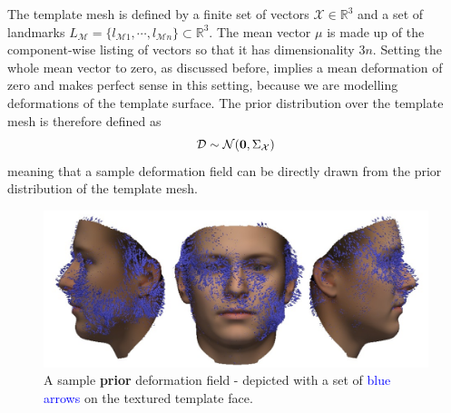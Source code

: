 The template mesh is defined by a finite set of vectors $\mathcal{X} \in \mathbb{R}^3$ and a set of landmarks $L_\mathcal{M}=\{l_{\mathcal{M}1}, \cdots, l_{\mathcal{M}n}\} \subset \mathbb{R}^3$.
The mean vector $\mu$ is made up of the component-wise listing of vectors so that it has dimensionality $3n$. Setting the whole mean vector to zero, as discussed before, implies a mean deformation of zero and makes perfect sense in this setting, because we are modelling deformations of the template surface. 
The prior distribution over the template mesh is therefore defined as 
\begin{equation}
    \mathcal{D} \sim \mathcal{N}(\textbf{0}, \Sigma_{\mathcal{X}})
\end{equation}
meaning that a sample deformation field can be directly drawn from the prior distribution of the template mesh.
\begin{figure}[h!]
    \includegraphics[width=\textwidth]{./resources/img/prior_deformations.pdf}
    \caption{A sample \textbf{prior} deformation field - depicted with a set of \textcolor{blue}{blue arrows} on the textured template face.}
\label{fig:priordeformations}
\end{figure}
